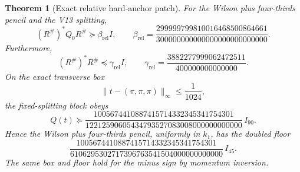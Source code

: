 \documentclass[11pt,oneside]{article}
\newtheorem{theorem}{Theorem}[section]
\theoremstyle{definition}
\theoremstyle{remark}
\begin{document}
\begin{theorem}[Exact relative hard-anchor patch]
\label{thm:newv14-relative-patch}
For the Wilson plus four-thirds pencil and the V13 splitting,
\[
 (R^\#)^*Q_0R^\#
 \succeq\beta_{\mathrm{rel}}I,\qquad
 \beta_{\mathrm{rel}}
 =
 \frac{299999799810016468500864661}
 {300000000000000000000000000}.                          \tag{14.6}
\]
Furthermore,
\[
 (R^\#)^*R^\#
 \preceq\gamma_{\mathrm{rel}}I,\qquad
 \gamma_{\mathrm{rel}}
 =
 \frac{3882277999062472511}{400000000000000}.             \tag{14.7}
\]
On the exact transverse box
\[
 \|t-(\pi,\pi,\pi)\|_\infty\le\frac1{1024},               \tag{14.8}
\]
the fixed-splitting block obeys
\[
 Q(t)\succeq
 \frac{1005674410887415714332345341754301}
 {12212590605434793527083008000000000000}\,I_{90}.        \tag{14.9}
\]
Hence the Wilson plus four-thirds pencil, uniformly in \(k_1\),
has the doubled floor
\[
 \frac{1005674410887415714332345341754301}
 {6106295302717396763541504000000000000}\,I_{45}.         \tag{14.10}
\]
The same box and floor hold for the minus sign by momentum inversion.
\end{theorem}
\end{document}
